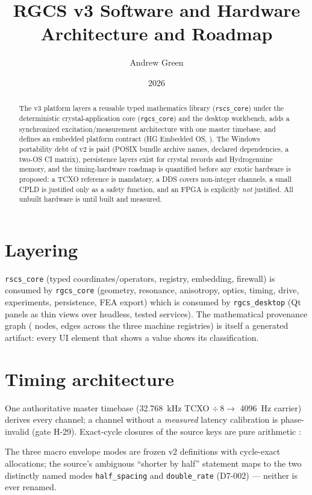 \documentclass[10pt,letterpaper]{article}
\title{\vspace{-2.0em}\textbf{RGCS v3 Software and Hardware\\
Architecture and Roadmap}}
\author{Andrew Green}
\date{2026}
\begin{document}
\maketitle

\begin{abstract}
The v3 platform layers a reusable typed mathematics library
(\texttt{rscs\_core}) under the deterministic crystal-application core
(\texttt{rgcs\_core}) and the desktop workbench, adds a synchronized
excitation/measurement architecture with one master timebase, and defines
an embedded platform contract (HG Embedded OS, \ENG). The Windows
portability debt of v2 is paid (POSIX bundle archive names, declared
dependencies, a two-OS CI matrix), persistence layers exist for crystal
records and Hydrogenuine memory, and the timing-hardware roadmap is
quantified before any exotic hardware is proposed: a TCXO reference is
mandatory, a DDS covers non-integer channels, a small CPLD is justified
only as a safety function, and an FPGA is explicitly \emph{not}
justified. All unbuilt hardware is \ENG{} until built and measured.
\end{abstract}

\section{Layering}
\texttt{rscs\_core} (typed coordinates/operators, registry, embedding,
firewall) is consumed by \texttt{rgcs\_core} (geometry, resonance,
anisotropy, optics, timing, drive, experiments, persistence, FEA export)
which is consumed by \texttt{rgcs\_desktop} (Qt panels as thin views over
headless, tested services). The mathematical provenance graph
(\gvGraphNodes{} nodes, \gvGraphEdges{} edges across the three machine
registries) is itself a generated artifact: every UI element that shows a
value shows its classification.

\section{Timing architecture}
One authoritative master timebase (\SI{32.768}{\kilo\hertz} TCXO
$\div\,8 \to$ \SI{4096}{\hertz} carrier) derives every channel; a channel
without a \emph{measured} latency calibration is phase-invalid (gate
H-29). Exact-cycle closures of the source keys \SRC{} are pure
arithmetic \DER:


The three macro envelope modes are frozen v2 definitions with cycle-exact
allocations; the source's ambiguous ``shorter by half'' statement maps to
the two distinctly named modes \texttt{half\_spacing} and
\texttt{double\_rate} (D7-002) --- neither is ever renamed.
\end{document}
